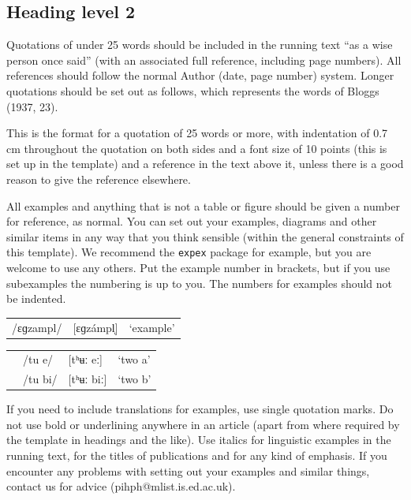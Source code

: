 \documentclass[article, a4paper, 12pt]{memoir}
\renewenvironment{quote}{\list{}{\leftmargin=0.7cm\rightmargin=0.7cm}\item[]\footnotesize}{\endlist}
\begin{document}
\subsection{Heading level 2}
\label{sec:heading-level-2}

Quotations of under 25 words should be included in the running text \enquote{as a wise person once said} (with an associated full reference, including page numbers). All references should follow the normal Author (date, page number) system.  Longer quotations should be set out as follows, which represents the words of Bloggs (1937, 23).

\begin{quote}
This is the format for a quotation of 25 words or more, with indentation of 0.7 cm throughout the quotation on both sides and a font size of 10 points (this is set up in the template) and a reference in the text above it, unless there is a good reason to give the reference elsewhere.
\end{quote}

All examples and anything that is not a table or figure should be given a number for reference, as normal. You can set out your examples, diagrams and other similar items in any way that you think sensible (within the general constraints of this template). We recommend the \texttt{expex} package for example, but you are welcome to use any others. Put the example number in brackets, but if you use subexamples the numbering is up to you. The numbers for examples should not be indented.

\ex\begin{tabular}[t]{lll}
     /ɛɡzampl/ & [ɛɡzámpl̩] & `example'
   \end{tabular}
\xe

\ex{}\begin{tabular}[t]{>{\tl}llll} %
& /tu e/ & [tʰʉː eː] & `two a' \\
& /tu bi/ & [tʰʉː biː] & `two b'
\end{tabular}
\xe 

If you need to include translations for examples, use single quotation marks. Do not use bold or underlining anywhere in an article (apart from where required by the template in headings and the like). Use italics for linguistic examples in the running text, for the titles of publications and for any kind of emphasis. If you encounter any problems with setting out your examples and similar things, contact us for advice (pihph@\hspace{0pt}mlist.is.ed.ac.uk).
\end{document}
